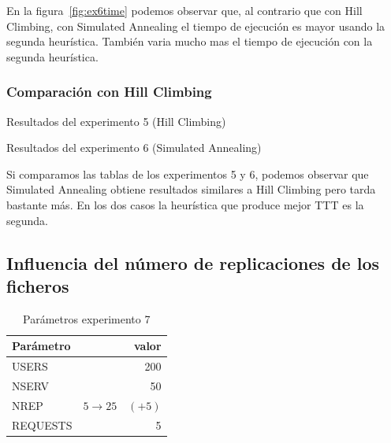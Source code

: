 En la figura~\ref{fig:ex6time} podemos observar que, al contrario que con Hill Climbing, con Simulated Annealing
el tiempo de ejecución es mayor usando la segunda heurística. También varia mucho mas el tiempo de ejecución
con la segunda heurística.

\subsubsection{Comparación con Hill Climbing}

\vspace{-1.4em}
\begin{table}[H]
    \caption{Resultados del experimento 5 (Hill Climbing)}%
    \label{tab:ex5_comp}
    \vspace{-1.4em}
    \begin{center}
    
    \end{center}
    \caption{Resultados del experimento 6 (Simulated Annealing)}%
    \label{tab:ex6_comp}
    \vspace{-1.4em}
    \begin{center}
    
    \end{center}
\end{table}

Si comparamos las tablas de los experimentos 5 y 6, podemos observar que Simulated Annealing
obtiene resultados similares a Hill Climbing pero tarda bastante más. En los dos casos
la heurística que produce mejor TTT es la segunda.



\pagebreak
\subsection{Influencia del número de replicaciones de los ficheros}%
\label{sub:exp7}

\begin{table}[H]
    \caption{Parámetros experimento 7}%
    \label{tab:ex7_par}
    \begin{center}
    \begin{tabular}{lr}
    \toprule
    Parámetro & valor \\
    \midrule
    USERS & 200 \\
    NSERV & 50 \\
    NREP & $5 \to 25 \quad (+5)$ \\
    REQUESTS & 5\\
    \bottomrule
    \end{tabular}
    \end{center}
\end{table}

